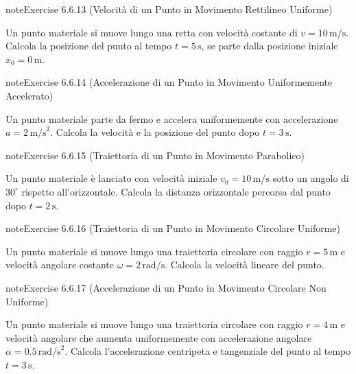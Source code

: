 \documentclass[letterpaper,10pt,italian]{jupyterBook}
\begin{document}
\begin{sphinxadmonition}{note}{Exercise 6.6.13 (Velocità di un Punto in Movimento Rettilineo Uniforme)}



\sphinxAtStartPar
Un punto materiale si muove lungo una retta con velocità costante di \(v = 10 \, \text{m/s}\). Calcola la posizione del punto al tempo \(t = 5 \, \text{s}\), se parte dalla posizione iniziale \(x_0 = 0 \, \text{m}\).
\end{sphinxadmonition}
 \label{exercise:ch/mechanics/kinematics-problems-exercise-13}

\begin{sphinxadmonition}{note}{Exercise 6.6.14 (Accelerazione di un Punto in Movimento Uniformemente Accelerato)}



\sphinxAtStartPar
Un punto materiale parte da fermo e accelera uniformemente con accelerazione \(a = 2 \, \text{m/s}^2\). Calcola la velocità e la posizione del punto dopo \(t = 3 \, \text{s}\).
\end{sphinxadmonition}
 \label{exercise:ch/mechanics/kinematics-problems-exercise-14}

\begin{sphinxadmonition}{note}{Exercise 6.6.15 (Traiettoria di un Punto in Movimento Parabolico)}



\sphinxAtStartPar
Un punto materiale è lanciato con velocità iniziale \(v_0 = 10 \, \text{m/s}\) sotto un angolo di \(30^\circ\) rispetto all’orizzontale. Calcola la distanza orizzontale percorsa dal punto dopo \(t = 2 \, \text{s}\).
\end{sphinxadmonition}
 \label{exercise:ch/mechanics/kinematics-problems-exercise-15}

\begin{sphinxadmonition}{note}{Exercise 6.6.16 (Traiettoria di un Punto in Movimento Circolare Uniforme)}



\sphinxAtStartPar
Un punto materiale si muove lungo una traiettoria circolare con raggio \(r = 5 \, \text{m}\) e velocità angolare costante \(\omega = 2 \, \text{rad/s}\). Calcola la velocità lineare del punto.
\end{sphinxadmonition}
 \label{exercise:ch/mechanics/kinematics-problems-exercise-16}

\begin{sphinxadmonition}{note}{Exercise 6.6.17 (Accelerazione di un Punto in Movimento Circolare Non Uniforme)}



\sphinxAtStartPar
Un punto materiale si muove lungo una traiettoria circolare con raggio \(r = 4 \, \text{m}\) e velocità angolare che aumenta uniformemente con accelerazione angolare \(\alpha = 0.5 \, \text{rad/s}^2\). Calcola l’accelerazione centripeta e tangenziale del punto al tempo \(t = 3 \, \text{s}\).
\end{sphinxadmonition}
\end{document}
